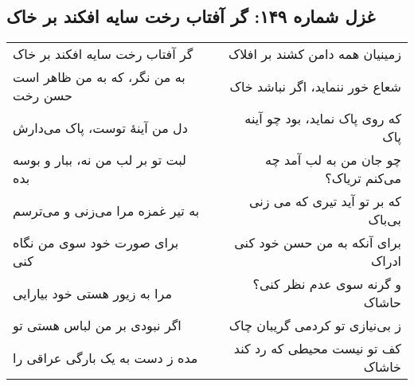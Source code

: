 \begin{center}
\section*{غزل شماره ۱۴۹: گر آفتاب رخت سایه افکند بر خاک}
\label{sec:149}
\begin{longtable}{l p{0.5cm} r}
گر آفتاب رخت سایه افکند بر خاک
&&
زمینیان همه دامن کشند بر افلاک
\\
به من نگر، که به من ظاهر است حسن رخت
&&
شعاع خور ننماید، اگر نباشد خاک
\\
دل من آینهٔ توست، پاک می‌دارش
&&
که روی پاک نماید، بود چو آینه پاک
\\
لبت تو بر لب من نه، ببار و بوسه بده
&&
چو جان من به لب آمد چه می‌کنم تریاک؟
\\
به تیر غمزه مرا می‌زنی و می‌ترسم
&&
که بر تو آید تیری که می زنی بی‌باک
\\
برای صورت خود سوی من نگاه کنی
&&
برای آنکه به من حسن خود کنی ادراک
\\
مرا به زیور هستی خود بیارایی
&&
و گرنه سوی عدم نظر کنی؟حاشاک
\\
اگر نبودی بر من لباس هستی تو
&&
ز بی‌نیازی تو کردمی گریبان چاک
\\
مده ز دست به یک بارگی عراقی را
&&
کف تو نیست محیطی که رد کند خاشاک
\\
\end{longtable}
\end{center}
